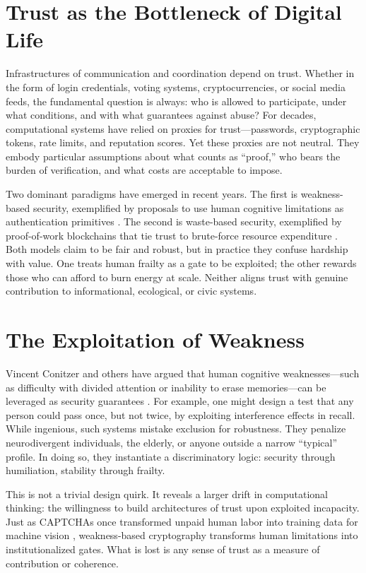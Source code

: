 \documentclass[openany]{book}
\begin{document}
\section{Trust as the Bottleneck of Digital Life}

Infrastructures of communication and coordination depend on trust. Whether in the form of login credentials, voting systems, cryptocurrencies, or social media feeds, the fundamental question is always: who is allowed to participate, under what conditions, and with what guarantees against abuse? For decades, computational systems have relied on proxies for trust—passwords, cryptographic tokens, rate limits, and reputation scores. Yet these proxies are not neutral. They embody particular assumptions about what counts as ``proof,'' who bears the burden of verification, and what costs are acceptable to impose.

Two dominant paradigms have emerged in recent years. The first is weakness-based security, exemplified by proposals to use human cognitive limitations as authentication primitives \cite{conitzer2020}. The second is waste-based security, exemplified by proof-of-work blockchains that tie trust to brute-force resource expenditure \cite{nakamoto2008}. Both models claim to be fair and robust, but in practice they confuse hardship with value. One treats human frailty as a gate to be exploited; the other rewards those who can afford to burn energy at scale. Neither aligns trust with genuine contribution to informational, ecological, or civic systems.

\section{The Exploitation of Weakness}

Vincent Conitzer and others have argued that human cognitive weaknesses—such as difficulty with divided attention or inability to erase memories—can be leveraged as security guarantees \cite{conitzer2020}. For example, one might design a test that any person could pass once, but not twice, by exploiting interference effects in recall. While ingenious, such systems mistake exclusion for robustness. They penalize neurodivergent individuals, the elderly, or anyone outside a narrow ``typical'' profile. In doing so, they instantiate a discriminatory logic: security through humiliation, stability through frailty.

This is not a trivial design quirk. It reveals a larger drift in computational thinking: the willingness to build architectures of trust upon exploited incapacity. Just as CAPTCHAs once transformed unpaid human labor into training data for machine vision \cite{vonahn2003}, weakness-based cryptography transforms human limitations into institutionalized gates. What is lost is any sense of trust as a measure of contribution or coherence.
\end{document}
